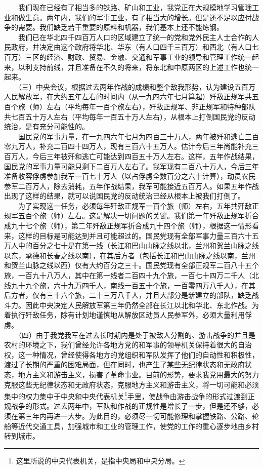 \documentclass[cn,11pt,chinese]{elegantbook}
\begin{document}
　　我们现在已经有了相当多的铁路、矿山和工业，我党正在大规模地学习管理工业和做生意。两年内，我们的军事工业，有了相当大的增长。但是还不足以应付战争的需要。我们缺乏若干重要的原料和机器，我们基本上还不能炼钢。\\
　　我们已在华北四千四百万人口的区域建立了统一的党和党外民主人士合作的人民政府，并决定由这个政府将华北、华东（有人口四千三百万）和西北（有人口七百万）三区的经济、财政、贸易、金融、交通和军事工业的领导和管理工作统一起来，以利支持前线，并且准备在不久的将来，将东北和中原两区的上述工作也统一起来。\\
　　（三）中央会议，根据过去两年作战的成绩和整个敌我形势，认为建设五百万人民解放军，在大约五年左右的时间内（从一九四六年七月算起）歼敌正规军共五百个旅（师）左右（平均每年一百个旅左右），歼敌正规军、非正规军和特种部队共七百五十万人左右（平均每年一百五十万人左右），从根本上打倒国民党的反动统治，是有充分可能性的。\\
　　国民党的军事力量，在一九四六年七月为四百三十万人，两年被歼和逃亡三百零九万人，补充二百四十四万人，现有三百六十五万人。估计今后三年尚能补充三百万人，今后三年被歼和逃亡可能达到四百五十万人左右。这样，五年作战结果，国民党的军事力量可能只剩下二百万人左右了。我军现有二百八十万人，今后三年准备收容俘虏参加我军一百七十万人（以占俘虏全数百分之六十计算），动员农民参军二百万人，除去消耗，五年作战结果，我军可能接近五百万人。如果五年作战出现了这样的结果，就可以说国民党的反动统治已经从根本上被我们打倒了。\\
　　为了实现这一任务，必须每年歼敌正规军一百个旅（师）左右，五年共歼敌正规军五百个旅（师）左右。这是解决一切问题的关键。我们第一年歼敌正规军折合成九十七个旅（师），第二年歼敌正规军折合成九十四个旅（师），根据这一情形看来，这样的目标是可能达到并且可能超过的。国民党现有全部军事力量三百六十五万人中的百分之七十是在第一线（长江和巴山山脉之线以北，兰州和贺兰山脉之线以东，承德和长春之线以南），在其后方者（包括长江和巴山山脉之线以南，兰州和贺兰山脉之线以西）仅有大约百分之三十。国民党现有全部正规军二百八十五个旅，一百九十八万人，其中在第一线者二百四十九个旅，一百七十四万二千人（北线九十九个旅，六十九万四千人，南线一百五十个旅，一百零四万八千人），在其后方者，仅有三十六个旅，二十三万八千人，并且大部分是新建立的部队，缺乏战斗力。因此中央决定人民解放军第三年仍然全部在长江以北和华北、东北作战。为着执行歼敌任务，除有计划地谨慎地从解放区动员人民参军外，必须大量利用俘虏。\\
　　（四）由于我党我军在过去长时期内是处于被敌人分割的、游击战争的并且是农村的环境之下，我们曾经允许各地方党的和军事的领导机关保持着很大的自治权，这一种情况，曾经使得各地方的党组织和军队发挥了他们的自动性和积极性，渡过了长期的严重的困难局面，但在同时，也产生了某些无纪律状态和无政府状态，地方主义和游击主义，损害了革命事业。目前的形势，要求我党用最大的努力克服这些无纪律状态和无政府状态，克服地方主义和游击主义，将一切可能和必须集中的权力集中于中央和中央代表机关\footnote[4]{ 这里所说的中央代表机关，是指中央局和中央分局。}手里，使战争由游击战争的形式过渡到正规战争的形式。过去两年中，军队和作战的正规性是增长了一步，但是还不够，必须在第三年内再进一大步。为此目的，必须尽一切可能修理和掌握铁路、公路、轮船等近代交通工具，加强城市和工业的管理工作，使党的工作的重心逐步地由乡村转到城市。\\
\end{document}
